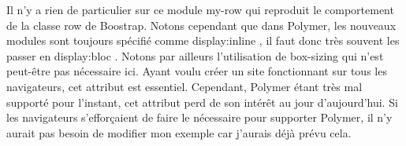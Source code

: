 \documentclass{article}
\begin{document}
Il n'y a rien de particulier sur ce module \og my-row \fg{} qui reproduit le comportement de la classe \og row \fg{} de Boostrap. Notons cependant que dans Polymer, les nouveaux modules sont toujours sp\'ecifi\'e comme \og display:inline \fg{}, il faut donc tr\`es souvent les passer en \og display:bloc \fg{}. Notons par ailleurs l'utilisation de box-sizing qui n'est peut-\^etre pas n\'ecessaire ici. Ayant voulu cr\'eer un site fonctionnant sur tous les navigateurs, cet attribut est essentiel. Cependant, Polymer \'etant tr\`es mal support\'e pour l'instant, cet attribut perd de son int\'er\^et au jour d'aujourd'hui. Si les navigateurs s'effor\c{c}aient de faire le n\'ecessaire pour supporter Polymer, il n'y aurait pas besoin de modifier mon exemple car j'aurais d\'ej\`a pr\'evu cela.
\vspace{0.5cm}\\
\vspace{0.5cm}
\end{document}
